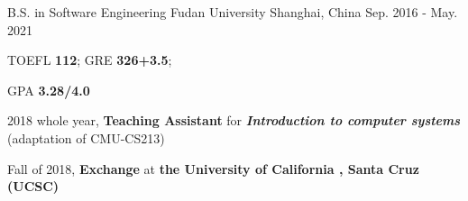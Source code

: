 

\begin{cventries}

  \cventry
    {B.S. in Software Engineering} %
    {Fudan University} %
    {Shanghai, China} %
    {Sep. 2016 - May. 2021} %
    {
      \begin{cvitems} %
        \item {TOEFL \textbf{112}; GRE \textbf{326+3.5};}
        \item {GPA \textbf{3.28/4.0}}
        \item {2018 whole year,  \textbf{Teaching Assistant} for \textbf{\textit{Introduction to computer systems}} (adaptation of CMU-CS213)}
        \item {Fall of 2018, \textbf{Exchange} at \textbf{the University of California ,  Santa Cruz (UCSC)} }
      \end{cvitems}
    }

\end{cventries}

